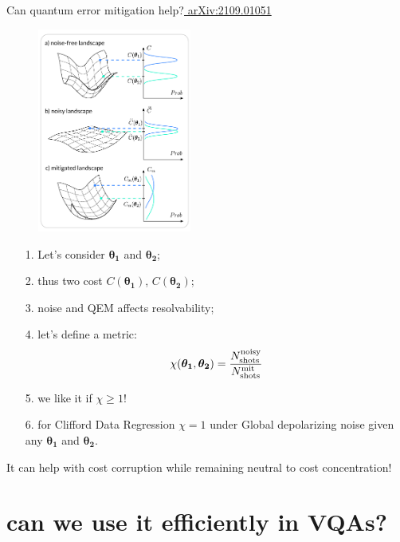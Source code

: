 \documentclass[8pt, xcolor={svgnames}, hyperref={linkcolor=black}]{beamer}
\begin{document}
\begin{frame}{Can quantum error mitigation help?\hfill \href{https://arxiv.org/abs/2109.01051}{\faBook\,\,arXiv:2109.01051}}
\begin{multicols}{2}
\begin{figure}
    \includegraphics[width=0.45\textwidth]{figures/NIBP_cropped.pdf}
\end{figure}
\pause
\begin{itemize}[noitemsep]
\item[1.] Let's consider $\bm{\theta_1}$ and $\bm{\theta_2}$;
\pause
\item[2.] thus two cost $C(\bm{\theta_1})$, $C(\bm{\theta_2})$;
\pause
\item[3.] noise and QEM affects resolvability;
\pause
\item[4.] let's define a metric: 
\vspace{-0.2cm}
$$ \chi(\bm{\theta_1}, \bm{\theta_2}) = \frac{N_{\rm shots}^{\rm noisy}}{N_{\rm shots}^{\rm mit}}$$
\pause
\vspace{-0.5cm}
\item[5.] we like it if $\chi \geq 1$!
\pause
\item[6.] for Clifford Data Regression $\chi=1$ under Global depolarizing noise given any $\bm{\theta_1}$ and $\bm{\theta_2}$.
\end{itemize}
\pause
\small
\begin{tcolorbox}[colback=blue!20, title=Good news!]
It can help with cost corruption while remaining neutral to cost concentration!
\end{tcolorbox}
\end{multicols}
\end{frame}

\section{can we use it efficiently in VQAs?}
\end{document}

